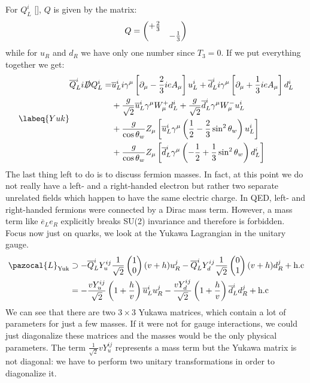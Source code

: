 \documentclass[../main.tex]{subfiles}
\begin{document}
For $Q_L^i$ [], $Q$ is given by the matrix:
\[
Q=\mqty(\dmat{+\frac{2}{3},-\frac{1}{3}})
\]
while for $u_R$ and $d_R$ we have only one number since $T_3=0$. If we put everything together we get:
\begin{equation}
\labeq{Yuk}
\begin{aligned}
\overline{Q}_L^ii\slashed{D}Q_L^i=&\overline{u}_L^ii\gamma^\mu\left[\partial_\mu-\frac{2}{3}ieA_\mu\right]u_L^i+\overline{d}_L^ii\gamma^\mu\left[\partial_\mu+\frac{1}{3}ieA_\mu\right]d_L^i\\
&+\frac{g}{\sqrt{2}}\overline{u}_L^i\gamma^\mu W_\mu^+d_L^i+\frac{g}{\sqrt{2}}\overline{d}_L^i\gamma^\mu W_\mu^-u_L^i\\
&+\frac{g}{\cos\theta_w}Z_\mu\left[\overline{u}_L^i\gamma^\mu\left(\frac{1}{2}-\frac{2}{3}\sin^2\theta_w\right)u_L^i\right]\\
&+\frac{g}{\cos\theta_w}Z_\mu\left[\overline{d}_L^i\gamma^\mu\left(-\frac{1}{2}+\frac{1}{3}\sin^2\theta_w\right)d_L^i\right]
\end{aligned}
\end{equation}
The last thing left to do is to discuss fermion masses. In fact, at this point we do not really have a left- and a right-handed electron but rather two separate unrelated fields which happen to have the same electric charge. In QED, left- and right-handed fermions were connected by a Dirac mass term. However, a mass term like $\overline{e}_Le_R$ explicitly breaks SU(2) invariance and therefore is forbidden.\\
Focus now just on quarks, we look at the Yukawa Lagrangian in the unitary gauge.
\begin{align*}
\pazocal{L}_{\text{Yuk}}&\supset-\overline{Q}_L^iY_u^{ij}\frac{1}{\sqrt{2}}\begin{pmatrix}
    1\\0
\end{pmatrix}(v+h)u_R^j-\overline{Q}_L^iY_d^{ij}\frac{1}{\sqrt{2}}\begin{pmatrix}
    0\\1
\end{pmatrix}(v+h)d_R^j+\text{h.c}\\
&=-\frac{vY_u^{ij}}{\sqrt{2}}\left(1+\frac{h}{v}\right)\overline{u}_L^iu_R^j-\frac{vY_d^{ij}}{\sqrt{2}}\left(1+\frac{h}{v}\right)\overline{d}_L^id_R^j+\text{h.c}
\end{align*}
We can see that there are two $3\times3$ Yukawa matrices, which contain a lot of parameters for just a few masses. If it were not for gauge interactions, we could just diagonalize these matrices and the masses would be the only physical parameters. The term $\frac{1}{\sqrt{2}}vY_u^{ij}$ represents a mass term but the Yukawa matrix is not diagonal: we have to perform two unitary transformations in order to diagonalize it.
\end{document}
